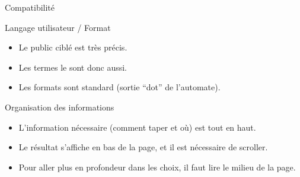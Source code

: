 \begin{frame}{Compatibilité}

  \begin{block}{Langage utilisateur / Format}
    \begin{itemize}
    \item Le public ciblé est très précis.
    \item Les termes le sont donc aussi.
    \item<pro@1-> Les formats sont standard (sortie ``dot'' de
      l'automate).
    \end{itemize}
  \end{block}


  \begin{block}{Organisation des informations}
    \begin{itemize}
    \item<pro@1-> L'information nécessaire (comment taper et où) est tout en haut.
    \item<con@1-> Le résultat s'affiche en bas de la page, et il est
      nécessaire de scroller.
    \item Pour aller plus en profondeur dans les choix, il faut lire
      le milieu de la page.
    \end{itemize}
  \end{block}


\end{frame}
